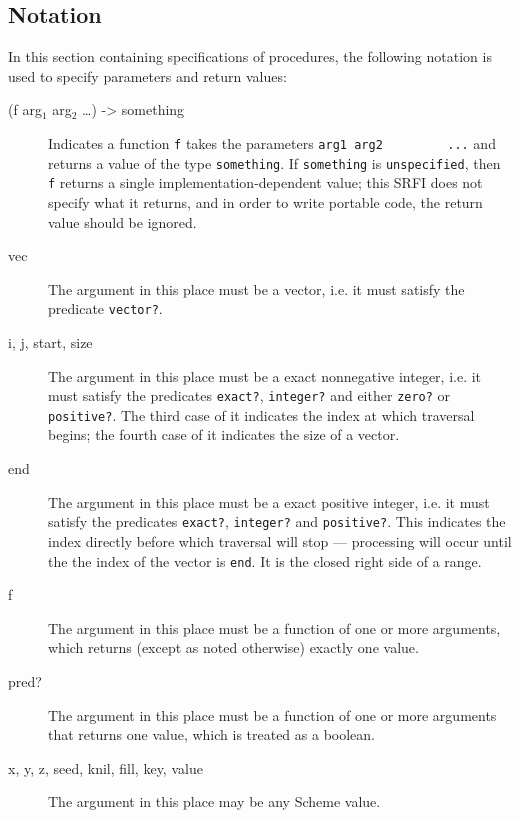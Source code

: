 \subsection{Notation}


In this section containing specifications of procedures, the following
notation is used to specify parameters and return values:
 
\begin{description}
\item[ (f arg$_1$ arg$_2$ \ldots{})
-> something]
Indicates a function \texttt{f} takes the parameters
\texttt{arg1\ arg2\ \ \ \ \ \ \ \ \ ...} and returns a value of the type
\texttt{something}. If \texttt{something} is \texttt{unspecified}, then
\texttt{f} returns a single implementation-dependent value; this SRFI
does not specify what it returns, and in order to write portable code,
the return value should be ignored.

\item[vec]
The argument in this place must be a vector, i.e. it must satisfy the
predicate \texttt{vector?}.

\item[i, j, start, size]
The argument in this place must be a exact nonnegative integer, i.e. it
must satisfy the predicates \texttt{exact?}, \texttt{integer?} and
either \texttt{zero?} or \texttt{positive?}. The third case of it
indicates the index at which traversal begins; the fourth case of it
indicates the size of a vector.

\item[end]
The argument in this place must be a exact positive integer, i.e. it
must satisfy the predicates \texttt{exact?}, \texttt{integer?} and
\texttt{positive?}. This indicates the index directly before which
traversal will stop --- processing will occur until the the index of the
vector is \texttt{end}. It is the closed right side of a
range.

\item[f]
The argument in this place must be a function of one or more arguments,
which returns (except as noted otherwise) exactly one
value.

\item[pred?]
The argument in this place must be a function of one or more arguments
that returns one value, which is treated as a boolean.

\item[ x, y, z, seed, knil, fill, key, value ]
The argument in this place may be any Scheme value.


\end{description}
